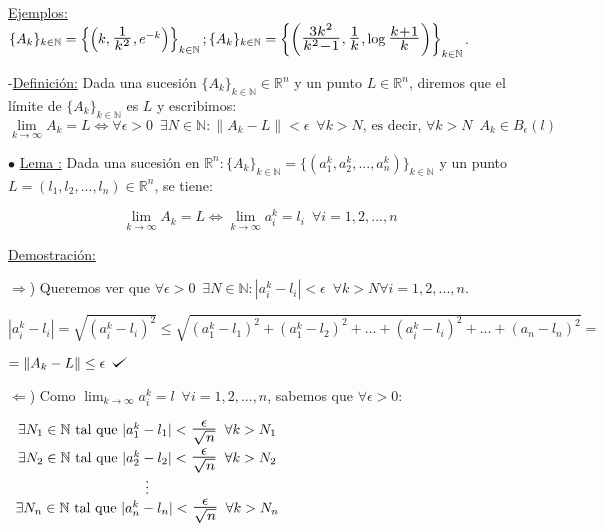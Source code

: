 \documentclass[10pt, titlepage]{article}
\def\checkmark{\tikz\fill[scale=0.4](0,.35) -- (.25,0) -- (1,.7) -- (.25,.15) -- cycle;}
\newcommand{\R}{\mathbb{R}}
\newcommand{\N}{\mathbb{N}}
\newcommand{\bfrac}[2]{\scalebox{1.4}{$\frac{#1}{#2}$}}
\newcommand{\spac}{\, \, \,}
\newcommand{\definicion}{\noindent-\underline{Definición:} }
\newcommand{\lema}[1][\!\!]{\noindent$\bullet$ \underline{Lema #1:} }
\begin{document}
\underline{Ejemplos:} $\{A_k\}_{k \in \N} = \left\{ \left (k, \bfrac{1}{k^2}, e^{-k}\right ) \right \}_{k \in \N}; \{A_k\}_{k \in \N} = \left \{ \left (\bfrac{3k^2}{k^2-1}, \bfrac{1}{k}, \log \bfrac{k+1}{k} \right 
)\right \}_{k \in \N}$.
\vspace{5mm}

\definicion Dada una sucesión $\{A_k\}_{k \in \N} \in \R^n$ y un punto $L \in \R^n$, 
diremos que el límite de $\{A_k\}_{k \in \N}$ es $L$ y escribimos: 
\[
\boxed{\displaystyle \lim_{k \to \infty} A_k = L \iff \forall \epsilon > 0 \spac \exists N \in \N : \|A_k - L\| < 
\epsilon \spac \forall k > N\text{, es decir, } \forall k > N \spac A_k \in B_\epsilon (l)}
\]


\lema Dada una sucesión en $\R^n : \{A_k\}_{k \in \N} = \{(a^k_1, a^k_2,..., a^k_n)\}_{k \in \N}$ y un 
punto $L = (l_1, l_2,..., l_n) \in \R^n$, se tiene:

\[
\boxed{\displaystyle \lim_{k \to \infty} A_k = L \iff \lim_{k \to \infty} a_i^k = l_i \spac \forall i = 1, 2,..., n}
\]
\vspace{3mm}

\underline{Demostración:}
\vspace{3mm}

$\Rightarrow$) Queremos ver que $\forall \epsilon > 0 \spac \exists N \in \N : |a_i^k - l_i| < \epsilon \spac 
\forall k > N \forall i = 1, 2,..., n$.
\vspace{3mm}

$|a_i^k - l_i| =\sqrt{(a_i^k - l_i)^2} \leq \sqrt{(a_1^k - l_1)^2 + (a_1^k - l_2)^2 + ... + (a_i^k - l_i)^2 +... 
+ (a_n - l_n)^2} =
$

$ = \|A_k - L\| \leq \epsilon \spac \checkmark$
\vspace{3mm}

$\Leftarrow$) Como $\displaystyle \lim_{k \to \infty} a_i^k = l \spac \forall i = 1, 2,..., n$, sabemos que $\forall \epsilon > 0 :$
\vspace{3mm}

$
\begin{array}{c}
\exists N_1 \in \N \text{ tal que } |a_1^k - l_1| < \bfrac{\epsilon}{\sqrt{n}} \spac \forall k > N_1 
\vspace{1mm}\\
\exists N_2 \in \N \text{ tal que } |a_2^k - l_2| < \bfrac{\epsilon}{\sqrt{n}} \spac \forall k > N_2 \\
\vdots\\
\exists N_n \in \N \text{ tal que } |a_n^k - l_n| < \bfrac{\epsilon}{\sqrt{n}} \spac \forall k > N_n\\
\end{array}
$
\vspace{3mm}
\end{document}
